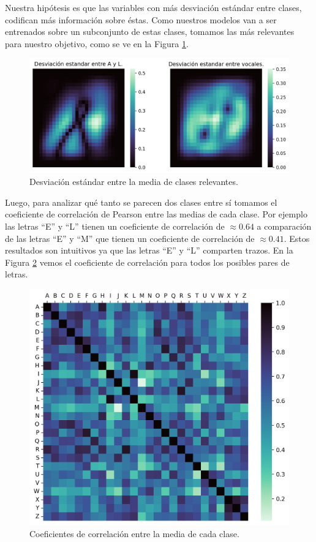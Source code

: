 \documentclass[11pt,a4paper, twocolumn]{article}
\begin{document}
Nuestra hipótesis es que las variables con más desviación estándar entre clases, codifican más información sobre éstas. Como nuestros modelos van a ser entrenados sobre un subconjunto de estas clases, tomamos las más relevantes para nuestro objetivo, como se ve en la Figura \ref{fig:3a}.

\begin{figure}[H]
	\centering
	\includegraphics[scale=0.7]{figuras/3a.png}
	\caption{Desviación estándar entre la media de clases relevantes.}
	\label{fig:3a}
\end{figure}

Luego, para analizar qué tanto se parecen dos clases entre sí tomamos el coeficiente de correlación de Pearson entre las medias de cada clase. Por ejemplo las letras ``E'' y ``L'' tienen un coeficiente de correlación de $\approx 0.64$ a comparación de las letras ``E'' y ``M'' que tienen un coeficiente de correlación de $\approx 0.41$. Estos resultados son intuitivos ya que las letras ``E'' y ``L'' comparten trazos. En la Figura \ref{fig:4a} vemos el coeficiente de correlación para todos los posibles pares de letras.

\begin{figure}[H]
	\centering
	\includegraphics[scale=0.6]{figuras/4a.png}
	\caption{Coeficientes de correlación entre la media de cada clase.}
	\label{fig:4a}
\end{figure}
\end{document}
